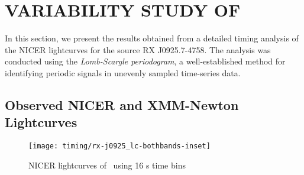 	
	\newpage
	\section{\MakeUppercase{Variability study of \source}} \label{results:variability}
		In this section, we present the results obtained from a detailed timing analysis of the NICER lightcurves for the source RX J0925.7-4758. The analysis was conducted using the \textit{Lomb-Scargle periodogram}, a well-established method for identifying periodic signals in unevenly sampled time-series data.
	
		\subsection{Observed NICER and XMM-Newton Lightcurves}
			\begin{figure}[h!]
				\centering
				\texttt{[image: timing/rx-j0925\_lc-bothbands-inset]}
				\caption{NICER lightcurves of \source\ using 16 s time bins}
				\label{result:lc-mrvel-nicer}
			\end{figure}
			
